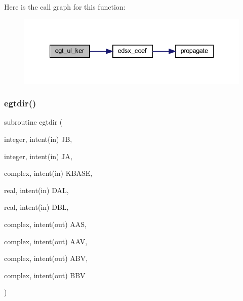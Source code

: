 Here is the call graph for this function\+:\nopagebreak
\begin{figure}[H]
\begin{center}
\leavevmode
\includegraphics[width=335pt]{Leroi__c_8f90_a8f7098d7bc36902fbbda312874c15120_cgraph}
\end{center}
\end{figure}
\mbox{\label{Leroi__c_8f90_a24151574c4bb3d7844db88f91d23b589}} 
\subsubsection{\texorpdfstring{egtdir()}{egtdir()}}
{\footnotesize\ttfamily subroutine egtdir (\begin{DoxyParamCaption}\item[{integer, intent(in)}]{JB,  }\item[{integer, intent(in)}]{JA,  }\item[{complex, intent(in)}]{K\+B\+A\+SE,  }\item[{real, intent(in)}]{D\+AL,  }\item[{real, intent(in)}]{D\+BL,  }\item[{complex, intent(out)}]{A\+AS,  }\item[{complex, intent(out)}]{A\+AV,  }\item[{complex, intent(out)}]{A\+BV,  }\item[{complex, intent(out)}]{B\+BV }\end{DoxyParamCaption})}

